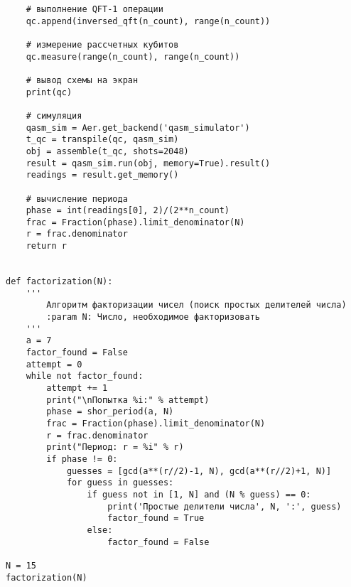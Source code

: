 \begin{verbatim}
    # выполнение QFT-1 операции
    qc.append(inversed_qft(n_count), range(n_count))

    # измерение рассчетных кубитов
    qc.measure(range(n_count), range(n_count))

    # вывод схемы на экран
    print(qc)

    # симуляция
    qasm_sim = Aer.get_backend('qasm_simulator')
    t_qc = transpile(qc, qasm_sim)
    obj = assemble(t_qc, shots=2048)
    result = qasm_sim.run(obj, memory=True).result()
    readings = result.get_memory()

    # вычисление периода
    phase = int(readings[0], 2)/(2**n_count)
    frac = Fraction(phase).limit_denominator(N)
    r = frac.denominator
    return r


def factorization(N):
    '''
        Алгоритм факторизации чисел (поиск простых делителей числа)
        :param N: Число, необходимое факторизовать
    '''
    a = 7
    factor_found = False
    attempt = 0
    while not factor_found:
        attempt += 1
        print("\nПопытка %i:" % attempt)
        phase = shor_period(a, N)
        frac = Fraction(phase).limit_denominator(N)
        r = frac.denominator
        print("Период: r = %i" % r)
        if phase != 0:
            guesses = [gcd(a**(r//2)-1, N), gcd(a**(r//2)+1, N)]
            for guess in guesses:
                if guess not in [1, N] and (N % guess) == 0:
                    print('Простые делители числа', N, ':', guess)
                    factor_found = True
                else:
                    factor_found = False

N = 15
factorization(N)
\end{verbatim}

\newpage

